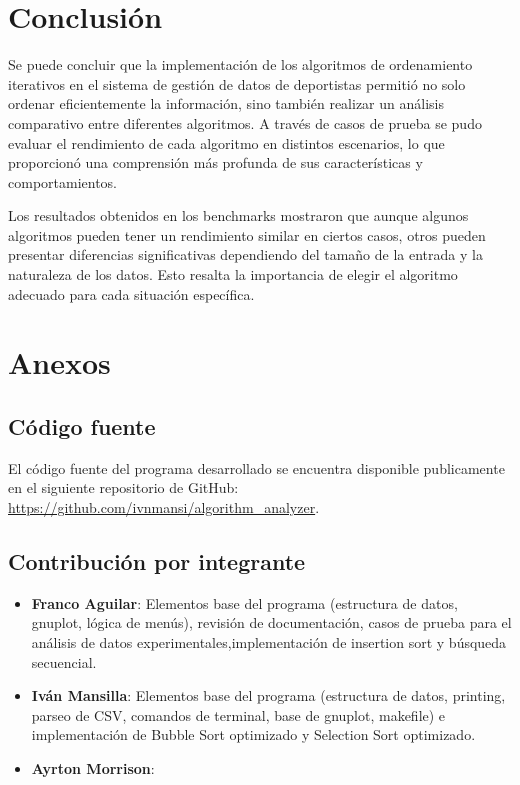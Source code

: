 \chapter{Conclusión}
Se puede concluir que la implementación de los algoritmos de ordenamiento iterativos en el sistema de gestión de datos de deportistas permitió no solo ordenar eficientemente la información, sino también realizar un análisis comparativo entre diferentes algoritmos. A través de casos de prueba se pudo evaluar el rendimiento de cada algoritmo en distintos escenarios, lo que proporcionó una comprensión más profunda de sus características y comportamientos.

Los resultados obtenidos en los benchmarks mostraron que aunque algunos algoritmos pueden tener un rendimiento similar en ciertos casos, otros pueden presentar diferencias significativas dependiendo del tamaño de la entrada y la naturaleza de los datos. Esto resalta la importancia de elegir el algoritmo adecuado para cada situación específica.

\chapter{Anexos}
\section{Código fuente}
El código fuente del programa desarrollado se encuentra disponible publicamente en el siguiente repositorio de GitHub: \url{https://github.com/ivnmansi/algorithm_analyzer}.
\section{Contribución por integrante}
\begin{itemize}
    \item \textbf{Franco Aguilar}: Elementos base del programa (estructura de datos, gnuplot, lógica de menús), revisión de documentación, casos de prueba para el análisis de datos experimentales,implementación de insertion sort y búsqueda secuencial.
    \item \textbf{Iván Mansilla}: Elementos base del programa (estructura de datos, printing, parseo de CSV, comandos de terminal, base de gnuplot, makefile) e implementación de Bubble Sort optimizado y Selection Sort optimizado.
    \item \textbf{Ayrton Morrison}: 
\end{itemize}